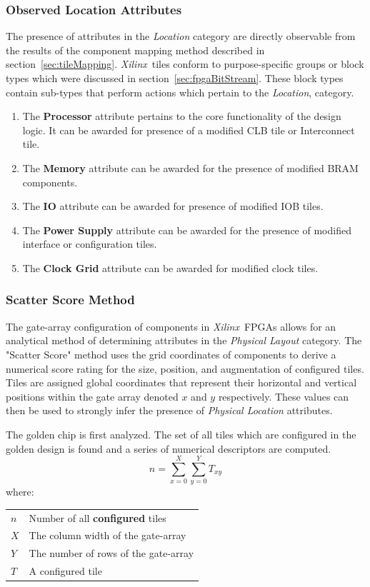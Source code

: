 \documentclass[conference]{IEEEtran}
\makeatletter
\newcommand{\Xilinx}{\textit{\gls{Xilinx}}~}
\newcommand{\ConditionSize}{\footnotesize}
\newenvironment{conditions}
{\par\vspace{\abovedisplayskip}\noindent\begin{tabular}{>{$}l<{$} @{${}={}$} l}}
	{\end{tabular}\par\vspace{\belowdisplayskip}}
\makeatother
\begin{document}
\subsubsection{Observed Location Attributes}
The presence of attributes in the \textit{Location} category are directly observable from the results of the component mapping method described in section~\ref{sec:tileMapping}.
\Xilinx tiles conform to purpose-specific groups or block types which were discussed in section~\ref{sec:fpgaBitStream}.
These block types contain sub-types that perform actions which pertain to the \textit{Location}, category. 
\begin{enumerate}
	\item The \textbf{Processor} attribute pertains to the core functionality of the design logic. It can be awarded for presence of a modified \acrshort{CLB} tile or Interconnect tile.
	\item The \textbf{Memory} attribute can be awarded for the presence of modified \acrshort{BRAM} components.
	\item The \textbf{\acrshort{IO}} attribute can be awarded for presence of modified \acrshort{IOB} tiles.
	\item The \textbf{Power Supply} attribute can be awarded for the presence of modified interface or configuration tiles.
	\item The \textbf{Clock Grid} attribute can be awarded for modified clock tiles.
\end{enumerate}
\subsubsection{Scatter Score Method} \label{sec:scatterScore}
The gate-array configuration of components in \Xilinx \acrshort{FPGA}s allows for an analytical method of determining attributes in the \textit{Physical Layout} category.
The "Scatter Score" method uses the grid coordinates of components to derive a numerical score rating for the size, position, and augmentation of configured tiles.
Tiles are assigned global coordinates that represent their horizontal and vertical positions within the gate array denoted $x$ and $y$ respectively. 
These values can then be used to strongly infer the presence of \textit{Physical Location} attributes.

The golden chip is first analyzed.
The set of all tiles which are configured in the golden design is found and a series of numerical descriptors are computed.
\begin{equation} \label{eqn:numConfiguredTiles}
n = \sum_{x = 0}^{X}\sum_{y = 0}^{Y}T_{xy}
\end{equation}
\ConditionSize
where:
\begin{conditions}
	n     &  Number of all \textbf{configured} tiles \\
	X     &  The column width of the gate-array \\   
	Y     &  The number of rows of the gate-array \\
	T     &  A configured tile
\end{conditions}
\normalsize
\end{document}
